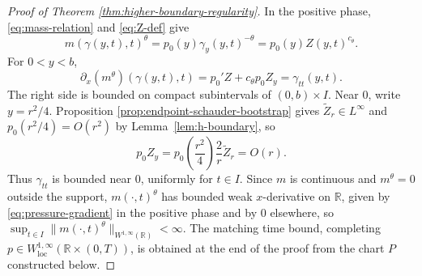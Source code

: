 \documentclass[11pt]{amsart}
\newcommand{\R}{\mathbb R}
\newcommand{\loc}{\mathrm{loc}}
\begin{document}
\begin{proof}[Proof of Theorem \ref{thm:higher-boundary-regularity}]
In the positive phase, \eqref{eq:mass-relation} and \eqref{eq:Z-def} give
\[
        m(\gamma(y,t),t)^\theta=p_0(y)\gamma_y(y,t)^{-\theta}
        =p_0(y)Z(y,t)^{c_\theta}.
\]
For \(0<y<b\),
\begin{equation}
\label{eq:pressure-gradient}
        \partial_x(m^\theta)(\gamma(y,t),t)
        =p_0'Z+c_\theta p_0Z_y
        =\gamma_{tt}(y,t).
\end{equation}
The right side is bounded on compact subintervals of \((0,b)\times I\). Near
\(0\), write \(y=r^2/4\). Proposition
\ref{prop:endpoint-schauder-bootstrap} gives \(\widetilde Z_r\in L^\infty\)
and \(p_0(r^2/4)=O(r^2)\) by Lemma~\ref{lem:h-boundary}, so
\[
        p_0Z_y=p_0\!\left(\frac{r^2}{4}\right)\frac{2}{r}\widetilde Z_r=O(r).
\]
Thus \(\gamma_{tt}\) is bounded near \(0\), uniformly for \(t\in I\).
Since \(m\) is continuous and \(m^\theta=0\) outside the support,
\(m(\cdot,t)^\theta\) has bounded weak \(x\)-derivative on \(\R\), given
by \eqref{eq:pressure-gradient} in the positive phase and by \(0\)
elsewhere, so
\(\sup_{t\in I}\|m(\cdot,t)^\theta\|_{W^{1,\infty}(\R)}<\infty\). The
matching time bound, completing
\(p\in W^{1,\infty}_{\loc}(\R\times(0,T))\), is obtained at the end of
the proof from the chart \(P\) constructed below.


\end{proof}
\end{document}
